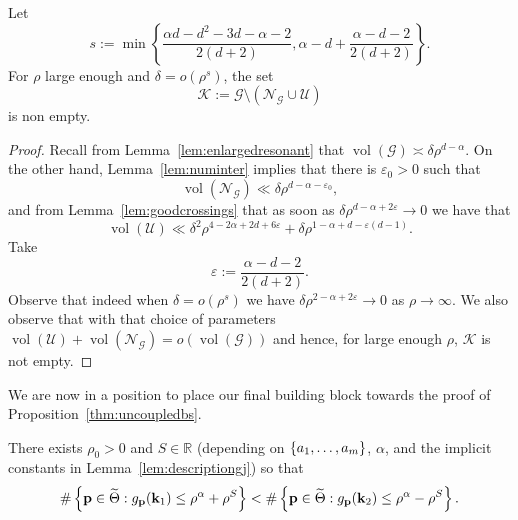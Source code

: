 \documentclass[AHL,Unicode,longabstracts,published]{cedram}
\DeclareMathOperator{\vol}{vol}
\newcommand{\R}{\mathbb R}
\newcommand{\CG}{\mathcal{G}}
\newcommand{\CK}{\mathcal{K}}
\newcommand{\CN}{\mathcal{N}}
\newcommand{\CU}{\mathcal{U}}
\newcommand{\bk}{\mathbf k}
\newcommand{\bp}{\mathbf p}
\newcommand{\eps}{\varepsilon}
\newcommand{\smallo}[1]{o\left(#1 \right)}
\newcommand{\set}[1]{\left\{ #1 \right\}}
\let\oldtilde\tilde
\renewcommand*{\tilde}[1]{\mathchoice{\widetilde{#1}}{\widetilde{#1}}{\oldtilde{#1}}{\oldtilde{#1}}}
\begin{document}
\begin{prop}\label{prop:overlap}
Let
\begin{equation}\label{eq:propoverlap}
s := \min \set{\frac{\alpha d - d^2 - 3d - \alpha - 2}{2(d+2)}, \alpha - d + \frac{\alpha - d - 2}{2(d+2)}}.
\end{equation}
For $\rho$ large enough and $\delta = \smallo{\rho^s}$, the set
\[
\CK:= \CG \setminus(\CN_\CG \cup \CU)
\]
is non empty.
\end{prop}
\begin{proof}
Recall from Lemma~\ref{lem:enlargedresonant} that $\vol(\CG) \asymp \delta
\rho^{d-\alpha}$. On the other hand, Lemma~\ref{lem:numinter} implies that there is $\eps_0 > 0$ such that
\begin{equation}
\vol(\CN_\CG) \ll \delta\rho^{d- \alpha - \eps_0},
\end{equation}
and from Lemma~\ref{lem:goodcrossings} that as soon as $\delta \rho^{d -
\alpha + 2 \eps} \to 0$ we have that
\begin{equation}
\vol(\CU) \ll \delta^2 \rho^{4 - 2 \alpha + 2 d + 6 \eps} + \delta \rho^{1 - \alpha + d - \eps(d-1)}.
\end{equation}
Take
\begin{equation}\label{eq:freefixed}
\eps := \frac{\alpha - d - 2}{2(d+2)}.
\end{equation}
Observe that indeed when $\delta = \smallo{\rho^s}$ we have $\delta \rho^{2 - \alpha + 2 \eps} \to 0$ as $\rho \to \infty$. We also observe that with that choice of parameters $\vol(\CU) + \vol(\CN_\CG) =
\smallo{\vol(\CG)}$ and hence, for large enough $\rho$, $\CK$ is not empty.
\end{proof}

We are now in a position to place our final building block towards the proof of Proposition~\ref{thm:uncoupledbs}.

\begin{prop}
There exists $\rho_0 > 0$ and $S \in \R$ (depending on $\{a_1,\dotsc,\linebreak a_m\}$, $\alpha$, and the implicit constants in Lemma~\ref{lem:descriptiongj}) so that
\begin{equation}\label{eq:countinggj}
\#\set{\bp \in \tilde \Theta : g_\bp(\bk_1) \le \rho^\alpha + \rho^S} <
\# \set{\bp \in \tilde \Theta : g_\bp(\bk_2) \le \rho^\alpha - \rho^S}.
\end{equation}
\end{prop}
\end{document}
